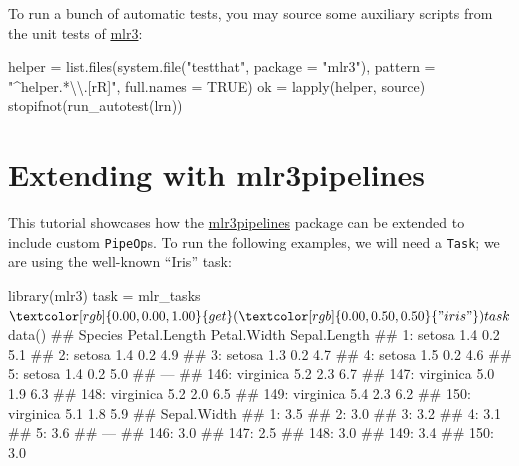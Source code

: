 \documentclass[
  11pt,
  parskip=half,
  DIV=calc,
  BCOR=10mm,
  x11names]{scrbook}
\newenvironment{Shaded}{}{}
\newcommand{\CharTok}[1]{\textcolor[rgb]{0.00,0.50,0.50}{#1}}
\newcommand{\DataTypeTok}[1]{#1}
\newcommand{\KeywordTok}[1]{\textcolor[rgb]{0.00,0.00,1.00}{#1}}
\newcommand{\NormalTok}[1]{#1}
\newcommand{\OperatorTok}[1]{#1}
\newcommand{\OtherTok}[1]{\textcolor[rgb]{1.00,0.25,0.00}{#1}}
\newcommand{\StringTok}[1]{\textcolor[rgb]{0.00,0.50,0.50}{#1}}
\begin{document}
To run a bunch of automatic tests, you may source some auxiliary scripts from the unit tests of \href{https://mlr3.mlr-org.com}{mlr3}:

\begin{Shaded}
\begin{Highlighting}[]
\NormalTok{helper =}\StringTok{ }\KeywordTok{list.files}\NormalTok{(}\KeywordTok{system.file}\NormalTok{(}\StringTok{"testthat"}\NormalTok{, }\DataTypeTok{package =} \StringTok{"mlr3"}\NormalTok{), }
  \DataTypeTok{pattern =} \StringTok{"^helper.*}\CharTok{\textbackslash{}\textbackslash{}}\StringTok{.[rR]"}\NormalTok{, }\DataTypeTok{full.names =} \OtherTok{TRUE}\NormalTok{)}
\NormalTok{ok =}\StringTok{ }\KeywordTok{lapply}\NormalTok{(helper, source)}
\KeywordTok{stopifnot}\NormalTok{(}\KeywordTok{run_autotest}\NormalTok{(lrn))}
\end{Highlighting}
\end{Shaded}

\hypertarget{extending-mlr3pipelines}{%
\section{Extending with mlr3pipelines}\label{extending-mlr3pipelines}}

This tutorial showcases how the \href{https://mlr3pipelines.mlr-org.com}{mlr3pipelines} package can be extended to include custom \texttt{PipeOp}s.
To run the following examples, we will need a \texttt{Task}; we are using the well-known ``Iris'' task:

\begin{Shaded}
\begin{Highlighting}[]
\KeywordTok{library}\NormalTok{(mlr3)}
\NormalTok{task =}\StringTok{ }\NormalTok{mlr_tasks}\OperatorTok{$}\KeywordTok{get}\NormalTok{(}\StringTok{"iris"}\NormalTok{)}
\NormalTok{task}\OperatorTok{$}\KeywordTok{data}\NormalTok{()}
\NormalTok{##        Species Petal.Length Petal.Width Sepal.Length}
\NormalTok{##   1:    setosa          1.4         0.2          5.1}
\NormalTok{##   2:    setosa          1.4         0.2          4.9}
\NormalTok{##   3:    setosa          1.3         0.2          4.7}
\NormalTok{##   4:    setosa          1.5         0.2          4.6}
\NormalTok{##   5:    setosa          1.4         0.2          5.0}
\NormalTok{##  ---                                                }
\NormalTok{## 146: virginica          5.2         2.3          6.7}
\NormalTok{## 147: virginica          5.0         1.9          6.3}
\NormalTok{## 148: virginica          5.2         2.0          6.5}
\NormalTok{## 149: virginica          5.4         2.3          6.2}
\NormalTok{## 150: virginica          5.1         1.8          5.9}
\NormalTok{##      Sepal.Width}
\NormalTok{##   1:         3.5}
\NormalTok{##   2:         3.0}
\NormalTok{##   3:         3.2}
\NormalTok{##   4:         3.1}
\NormalTok{##   5:         3.6}
\NormalTok{##  ---            }
\NormalTok{## 146:         3.0}
\NormalTok{## 147:         2.5}
\NormalTok{## 148:         3.0}
\NormalTok{## 149:         3.4}
\NormalTok{## 150:         3.0}
\end{Highlighting}
\end{Shaded}
\end{document}

